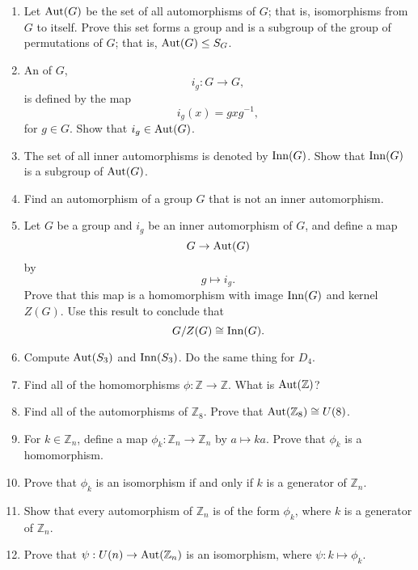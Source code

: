  
{\small
\begin{enumerate}
 
 
\item
Let $\operatorname{Aut}(G)$ be the set of all automorphisms of $G$; that is,
isomorphisms from $G$ to itself. Prove this set forms a group and is a
subgroup of the group of permutations of $G$; that is, $\operatorname{Aut}(G) \leq S_G$. 
 
 
\item
An  of $G$,
\[
i_g : G \rightarrow G,
\]
is defined by the map
\[
i_g(x) = g x g^{-1},
\]
for $g \in G$. Show that $i_g \in \operatorname{Aut}(G)$.
 
 
\item
The set of all inner automorphisms is denoted by $\operatorname{Inn}(G)$. Show that
$\operatorname{Inn}(G)$ is a subgroup of $\operatorname{Aut}(G)$. 
 
 
\item
Find an automorphism of a group $G$ that is not an inner automorphism.
 
 
\item
Let $G$ be a group and $i_g$ be an inner automorphism of $G$, and
define a map 
\[
G \rightarrow \operatorname{Aut}(G)
\]
by
\[
g \mapsto i_g.
\]
Prove that this map is a homomorphism with image $\operatorname{Inn}(G)$ and kernel
$Z(G)$. Use this result to conclude that 
\[
G/Z(G) \cong \operatorname{Inn}(G).
\]
 
 
\item
Compute $\operatorname{Aut}(S_3)$ and $\operatorname{Inn}(S_3)$.  Do the same thing for $D_4$.
 
 
\item
Find all of the homomorphisms $\phi : {\mathbb Z} \rightarrow {\mathbb Z}$.
What is $\operatorname{Aut}({\mathbb Z})$? 
 
 
\item
Find all of the automorphisms of ${\mathbb Z}_8$.  Prove that $\operatorname{Aut}({\mathbb
Z}_8) \cong U(8)$. 
 
 
\item
For $k \in {\mathbb Z}_n$, define a map $\phi_k : {\mathbb Z}_n \rightarrow
{\mathbb Z}_n$ by $a \mapsto ka$.  Prove that $\phi_k$ is a homomorphism. 
 
 
\item
Prove that $\phi_k$ is an isomorphism if and only if $k$ is a generator
of ${\mathbb Z}_n$. 
 
 
\item
Show that every automorphism of ${\mathbb Z}_n$ is of the form $\phi_k$,
where $k$ is a generator of ${\mathbb Z}_n$. 
 
 
\item
Prove that $\psi : U(n) \rightarrow \operatorname{Aut}({\mathbb Z}_n)$ is an
isomorphism, where $\psi : k \mapsto \phi_k$. 
 
 
\end{enumerate}
}

\sagesection
 
 
 
 
